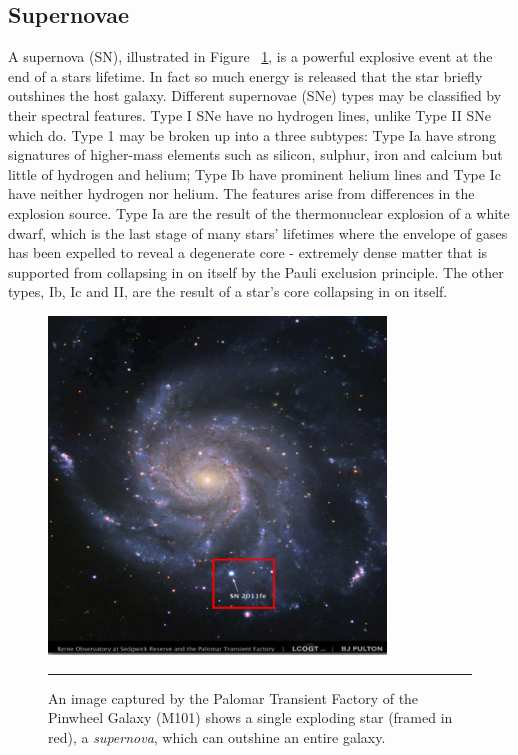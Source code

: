 \subsection{Supernovae}
A supernova (SN), illustrated in Figure ~\ref{fig:supernovae}, is a powerful explosive event at the end of a stars lifetime\citep{du2014machine}.
In fact so much energy is released that the star briefly outshines the host galaxy\citep{baade1938photographic}.
Different supernovae (SNe) types may be classified by their spectral features.
Type I SNe have no hydrogen lines, unlike Type II SNe which do.
Type 1 may be broken up into a three subtypes: Type Ia have strong signatures of higher-mass elements such as silicon, sulphur, iron and calcium but little of hydrogen and helium; Type Ib have prominent helium lines and Type Ic have neither hydrogen nor helium.
The features arise from differences in the explosion source.
Type Ia are the result of the thermonuclear explosion of a white dwarf, which is the last stage of many stars' lifetimes where the envelope of gases has been expelled to reveal a degenerate core - extremely dense matter that is supported from collapsing in on itself by the Pauli exclusion principle.
The other types, Ib, Ic and II, are the result of a star's core collapsing in on itself.
\begin{figure}[htbp]
	\centering
		\includegraphics[width = 0.8\textwidth]{./Figures/encyplopedia_of_machine_learning_SN.jpg}
		\rule{35em}{0.5pt}
	\caption[Supernovae]{An image captured by the Palomar Transient Factory of the Pinwheel Galaxy (M101) shows a single exploding star (framed in red), a \textit{supernova}, which can outshine an entire galaxy.}
	\label{fig:supernovae}
\end{figure}
